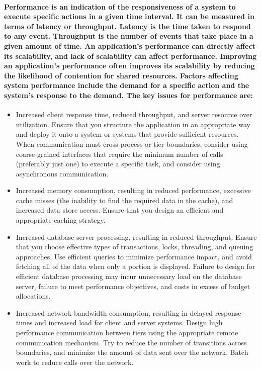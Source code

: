 \documentclass[../Psychological_system_web_application.tex]{subfiles}
\begin{document}
				\paragraph{\gls{Performance} is an indication of the responsiveness of a system to execute specific actions in a given time interval. It can be measured in terms of latency or throughput. Latency is the time taken to respond to any event. Throughput is the number of events that take place in a given amount of time. An application’s performance can directly affect its scalability, and lack of scalability can affect performance. Improving an application’s performance often improves its scalability by reducing the likelihood of contention for shared resources. Factors affecting system performance include the demand for a specific action and the system’s response to the demand. The key issues for performance are:}
				
				\begin{itemize}
					\item
						Increased client response time, reduced throughput, and server resource over utilization. Ensure that you structure the application in an appropriate way and deploy it onto a system or systems that provide sufficient resources. When communication must cross process or tier boundaries, consider using coarse-grained interfaces that require the minimum number of calls (preferably just one) to execute a specific task, and consider using asynchronous communication.
					\item
						Increased memory consumption, resulting in reduced performance, excessive cache misses (the inability to find the required data in the cache), and increased data store access. Ensure that you design an efficient and appropriate caching strategy.
					\item
						Increased database server processing, resulting in reduced throughput. Ensure that you choose effective types of transactions, locks, threading, and queuing approaches. Use efficient queries to minimize performance impact, and avoid fetching all of the data when only a portion is displayed. Failure to design for efficient database processing may incur unnecessary load on the database server, failure to meet performance objectives, and costs in excess of budget allocations.
					\item
						Increased network bandwidth consumption, resulting in delayed response times and increased load for client and server systems. Design high performance communication between tiers using the appropriate remote communication mechanism. Try to reduce the number of transitions across boundaries, and minimize the amount of data sent over the network. Batch work to reduce calls over the network.
				\end{itemize}
			
\end{document}
